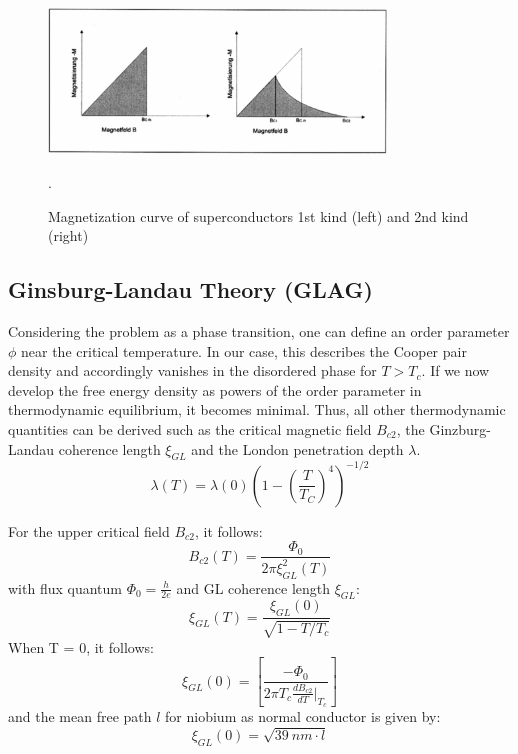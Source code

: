 \begin{figure}
    \centering
    \includegraphics[width=0.8\textwidth]{./fig/super.png}
    \caption{Magnetization curve of superconductors 1st kind (left) and 2nd kind (right)}.
    \label{fig:super}
\end{figure}


\subsection{Ginsburg-Landau Theory (GLAG)}
Considering the problem as a phase transition, one can define an order parameter $\phi$ near the critical temperature. In our case, this describes the Cooper pair density and accordingly vanishes in the disordered phase for $T>T_c$. If we now develop the free energy density as powers of the order parameter in thermodynamic equilibrium, it becomes minimal. Thus, all other thermodynamic quantities can be derived such as the critical magnetic field $B_{c2}$, the Ginzburg-Landau coherence length $\xi_{GL}$ and the London penetration depth $\lambda$.
\begin{equation}
    \lambda(T) = \lambda(0) \left( 1-\left( \frac{T}{T_C }\right )^4\right )^{-1/2} 
\end{equation}

For the upper critical field $B_{c2}$, it follows:
\begin{equation}
    B_{c2}(T) = \frac{\Phi_0}{2\pi\xi_{GL}^2(T) }
\end{equation}
with flux quantum $\Phi_0=\frac{h}{2e}$ and GL coherence length $\xi_{GL}$:
\begin{equation}
    \xi_{GL}(T) = \frac{\xi_{GL}(0)}{\sqrt{1-T/T_c}}
\end{equation}
When T = 0, it follows:
\begin{equation}
    \xi_{GL}(0)=\left[\frac{- \Phi_0}{2 \pi T_c \frac{dB_{c2}}{dT}|_{T_c}} \right ]
\end{equation}
and the mean free path $l$ for niobium as normal conductor is given by:
\begin{equation}
    \xi_{GL}(0) = \sqrt{\SI{39}{nm}\cdot l}
\end{equation}


